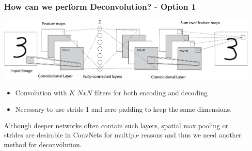 \documentclass{beamer}
\begin{document}

\begin{frame}
\frametitle{How can we perform Deconvolution? - Option 1}
\includegraphics[scale = 0.22]{img/example1.png} 

\begin{itemize}
\item Convolution with $K$ $NxN$ filters for both encoding and decoding
\item Necessary to use stride 1 and zero padding to keep the same dimensions.
\end{itemize}  \vspace{4mm}
Although deeper networks often contain such layers, spatial max pooling or strides are desirable in ConvNets for multiple reasons and thus we need another method for deconvolution.
\end{frame}
\end{document}
